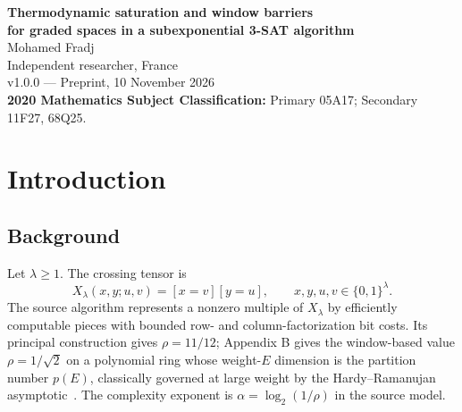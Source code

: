 \documentclass[10pt,a4paper]{article}
\numberwithin{equation}{section}
\theoremstyle{remark}\newtheorem{remark}[theorem]{Remark}\newtheorem{question}[theorem]{Question}
\newcommand{\rhow}{\rho_{\mathrm{win}}}\newcommand{\F}{\mathbb F}\newcommand{\K}{\mathbb K}\newcommand{\Z}{\mathbb Z}\newcommand{\R}{\mathbb R}\newcommand{\cB}{\mathcal L}\newcommand{\wt}{\mathrm{wt}}\newcommand{\dimn}{\operatorname{dim}}\newcommand{\supp}{\operatorname{supp}}
\begin{document}
\begin{center}
{\LARGE\bfseries\color{deep} Thermodynamic saturation and window barriers}\\[2pt]
{\Large\bfseries\color{deep} for graded spaces in a subexponential 3-SAT algorithm}\\[9pt]
{\large Mohamed Fradj}\\[3pt]
{\small Independent researcher, France}\\[4pt]
{\small v1.0.0 --- Preprint, 10 November 2026}\\[4pt]
{\footnotesize \textbf{2020 Mathematics Subject Classification:} Primary 05A17; Secondary 11F27, 68Q25.}
\end{center}

\begin{abstract}
Motivated by Majdoddin's four-leg piece question for the subexponential 3-SAT algorithm of~\cite{claude3sat}, we study the cost $\rhow$ of prescribed graded windows rather than the intrinsic ranks of the factorization matrices. The central window $s=0$ reduces the barrier to the entropy-growth inequality $\rhow\ge D(2h)/(2\lambda)$, and a thermodynamic scaling criterion controls this ratio. For the graded spaces $V_S$ constructed from $D_4^m$ and an arbitrary isotropic additive Klein-four code $S$, we prove uniformly in the code that
\[
\rhow(V_S;h,\lambda)\ge\frac1{\sqrt2}-C_{x_1,x_2}m^{-1/2},
\qquad x_1\le h/m\le x_2,\quad 2^\lambda\le\dimn(V_S)_h.
\]
The proof does not assume concavity or convergence of code weight distributions and uses a reproducible interval-sign test. This result constrains the specified window geometry at fixed density; it does not establish a bound on intrinsic factorization ranks, construct admissible operators, or cover the single-block high-density regime.
\end{abstract}
\tableofcontents
\section{Introduction}
\subsection{Background}
Let $\lambda\ge1$. The crossing tensor is
\begin{equation}\label{eq:cross}
X_\lambda(x,y;u,v)=[x=v][y=u],\qquad x,y,u,v\in\{0,1\}^\lambda.
\end{equation}
The source algorithm \cite{claude3sat} represents a nonzero multiple of $X_\lambda$ by efficiently computable pieces with bounded row- and column-factorization bit costs. Its principal construction gives $\rho=11/12$; Appendix B gives the window-based value $\rho=1/\sqrt2$ on a polynomial ring whose weight-$E$ dimension is the partition number $p(E)$, classically governed at large weight by the Hardy--Ramanujan asymptotic~\cite{hardyramanujan}. The complexity exponent is $\alpha=\log_2(1/\rho)$ in the source model.
\end{document}
